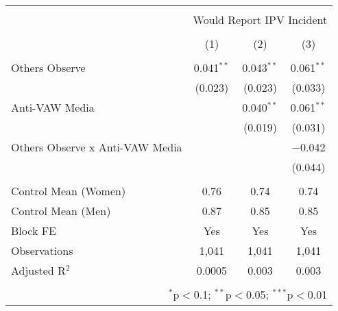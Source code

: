 
\begin{tabular}{@{\extracolsep{5pt}}lccc} 
\\[-1.8ex]\hline 
\hline \\[-1.8ex] 
 & \multicolumn{3}{c}{Would Report IPV Incident} \\ 
\\[-1.8ex] & (1) & (2) & (3)\\ 
\hline \\[-1.8ex] 
 Others Observe & 0.041$^{**}$ & 0.043$^{**}$ & 0.061$^{**}$ \\ 
  & (0.023) & (0.023) & (0.033) \\ 
  Anti-VAW Media &  & 0.040$^{**}$ & 0.061$^{**}$ \\ 
  &  & (0.019) & (0.031) \\ 
  Others Observe x Anti-VAW Media &  &  & $-$0.042 \\ 
  &  &  & (0.044) \\ 
 \hline \\[-1.8ex] 
Control Mean (Women) & 0.76 & 0.74 & 0.74 \\ 
Control Mean (Men) & 0.87 & 0.85 & 0.85 \\ 
Block FE & Yes & Yes & Yes \\ 
Observations & 1,041 & 1,041 & 1,041 \\ 
Adjusted R$^{2}$ & 0.0005 & 0.003 & 0.003 \\ 
\hline 
\hline \\[-1.8ex] 
\multicolumn{4}{r}{$^{*}$p$<$0.1; $^{**}$p$<$0.05; $^{***}$p$<$0.01} \\ 
\end{tabular} 
